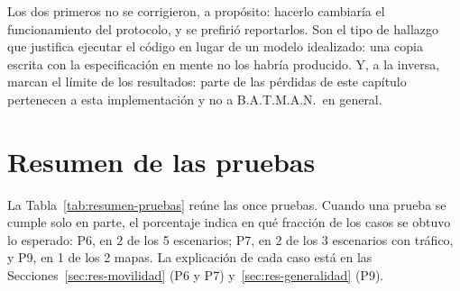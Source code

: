Los dos primeros no se corrigieron, a propósito: hacerlo cambiaría el
funcionamiento del protocolo, y se prefirió reportarlos. Son el tipo de hallazgo
que justifica ejecutar el código en lugar de un modelo idealizado: una copia
escrita con la especificación en mente no los habría producido. Y, a la
inversa, marcan el límite de los resultados: parte de las pérdidas de este
capítulo pertenecen a esta implementación y no a B.A.T.M.A.N.\ en general.

\section{Resumen de las pruebas}
\label{sec:res-resumen}

La Tabla~\ref{tab:resumen-pruebas} reúne las once pruebas. Cuando una prueba se
cumple solo en parte, el porcentaje indica en qué fracción de los casos se
obtuvo lo esperado: P6, en 2 de los 5 escenarios; P7, en 2 de los 3 escenarios
con tráfico, y P9, en 1 de los 2 mapas. La explicación de cada caso está en las
Secciones~\ref{sec:res-movilidad} (P6 y P7) y~\ref{sec:res-generalidad} (P9).

